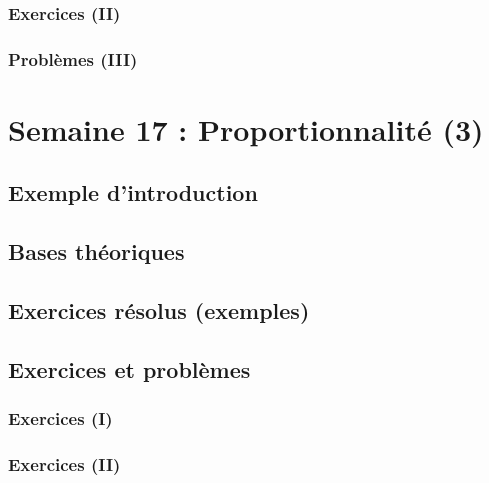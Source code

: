 \documentclass[
  12pt,
]{book}
\begin{document}
\hypertarget{exercices-ii-15}{%
\subsection{Exercices (II)}\label{exercices-ii-15}}

\hypertarget{probluxe8mes-iii-15}{%
\subsection{Problèmes (III)}\label{probluxe8mes-iii-15}}

\hypertarget{semaine-17-proportionnalituxe9-3}{%
\chapter{Semaine 17 : Proportionnalité (3)}\label{semaine-17-proportionnalituxe9-3}}

\hypertarget{exemple-dintroduction-16}{%
\section{Exemple d'introduction}\label{exemple-dintroduction-16}}

\hypertarget{bases-thuxe9oriques-16}{%
\section{Bases théoriques}\label{bases-thuxe9oriques-16}}

\hypertarget{exercices-ruxe9solus-exemples-16}{%
\section{Exercices résolus (exemples)}\label{exercices-ruxe9solus-exemples-16}}

\hypertarget{exercices-et-probluxe8mes-16}{%
\section{Exercices et problèmes}\label{exercices-et-probluxe8mes-16}}

\hypertarget{exercices-i-16}{%
\subsection{Exercices (I)}\label{exercices-i-16}}

\hypertarget{exercices-ii-16}{%
\subsection{Exercices (II)}\label{exercices-ii-16}}
\end{document}
